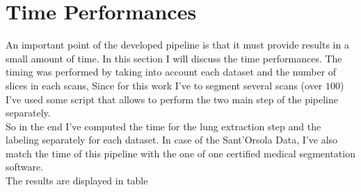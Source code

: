 \documentclass{standalone}
\begin{document}
	\section{Time Performances}
	
	An important point of the developed pipeline is that it must provide results in a small amount of time. In this section I will discuss the time performances. The timing was performed by taking into account each dataset and the number of slices in each scans,
	Since for this work I've to segment several scans (over $100$) I've used some script that allows to perform the two main step of the pipeline separately.\\
	So in the end I've computed the time for the lung extraction step and the labeling separately for each dataset. In case of the Sant'Orsola Data, I've also match the time of this pipeline with the one of one certified medical segmentation software.\\ The results are displayed in table
	
\end{document}
